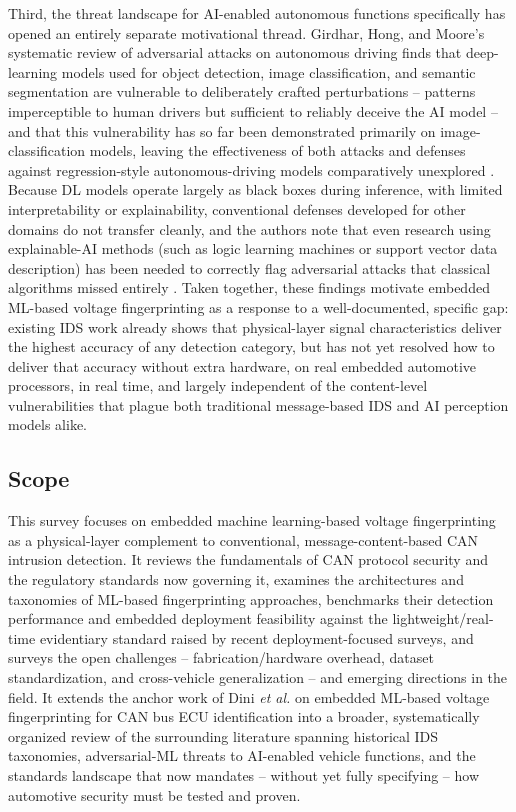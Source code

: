 \documentclass[journal]{IEEEtran}
\begin{document}
	Third, the threat landscape for AI-enabled autonomous functions
	specifically has opened an entirely separate motivational thread.
	Girdhar, Hong, and Moore's systematic review of adversarial attacks on
	autonomous driving finds that deep-learning models used for object
	detection, image classification, and semantic segmentation are
	vulnerable to deliberately crafted perturbations -- patterns
	imperceptible to human drivers but sufficient to reliably deceive the AI
	model -- and that this vulnerability has so far been demonstrated
	primarily on image-classification models, leaving the effectiveness of
	both attacks and defenses against regression-style autonomous-driving
	models comparatively unexplored \cite{ref2}. Because DL models operate
	largely as black boxes during inference, with limited interpretability
	or explainability, conventional defenses developed for other domains do
	not transfer cleanly, and the authors note that even research using
	explainable-AI methods (such as logic learning machines or support
	vector data description) has been needed to correctly flag adversarial
	attacks that classical algorithms missed entirely \cite{ref2}. Taken
	together, these findings motivate embedded ML-based voltage
	fingerprinting as a response to a well-documented, specific gap:
	existing IDS work already shows that physical-layer signal
	characteristics deliver the highest accuracy of any detection category,
	but has not yet resolved how to deliver that accuracy without extra
	hardware, on real embedded automotive processors, in real time, and
	largely independent of the content-level vulnerabilities that plague
	both traditional message-based IDS and AI perception models alike.
	
	\subsection{Scope}
	
	This survey focuses on embedded machine learning-based voltage
	fingerprinting as a physical-layer complement to conventional,
	message-content-based CAN intrusion detection. It reviews the
	fundamentals of CAN protocol security and the regulatory standards now
	governing it, examines the architectures and taxonomies of ML-based
	fingerprinting approaches, benchmarks their detection performance and
	embedded deployment feasibility against the lightweight/real-time
	evidentiary standard raised by recent deployment-focused surveys, and
	surveys the open challenges -- fabrication/hardware overhead, dataset
	standardization, and cross-vehicle generalization -- and emerging
	directions in the field. It extends the anchor work of Dini
	\textit{et al.} on embedded ML-based voltage fingerprinting for CAN bus
	ECU identification \cite{refDini} into a broader, systematically
	organized review of the surrounding literature spanning historical IDS
	taxonomies,
	adversarial-ML threats to AI-enabled vehicle functions, and the standards
	landscape that now mandates -- without yet fully specifying -- how
	automotive security must be tested and proven.
	
\end{document}
